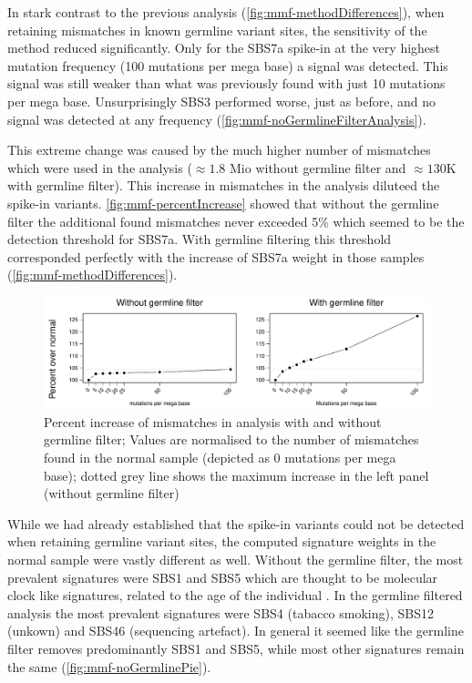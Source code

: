 In stark contrast to the previous analysis (\autoref{fig:mmf-methodDifferences}), when retaining mismatches in known germline variant sites, the sensitivity of the method reduced significantly. Only for the SBS7a spike-in at the very highest mutation frequency (100 mutations per mega base) a signal was detected. This signal was still weaker than what was previously found with just 10 mutations per mega base. Unsurprisingly SBS3 performed worse, just as before, and no signal was detected at any frequency (\autoref{fig:mmf-noGermlineFilterAnalysis}).

This extreme change was caused by the much higher number of mismatches which were used in the analysis ($\approx 1.8$ Mio without germline filter and $\approx 130$K with germline filter).
This increase in mismatches in the analysis diluteed the spike-in variants. \autoref{fig:mmf-percentIncrease} showed that without the germline filter the additional found mismatches never exceeded 5\% which seemed to be the detection threshold for SBS7a. With germline filtering this threshold corresponded perfectly with the increase of SBS7a weight in those samples (\autoref{fig:mmf-methodDifferences}).

\begin{figure}[ht]
\centering
\includegraphics[width=.99\linewidth]{Figures/MisMatchFinder/spikeInPercentage.pdf}
\caption[Percent increase of mismatches in analysis with and without germline filter]{Percent increase of mismatches in analysis with and without germline filter; Values are normalised to the number of mismatches found in the normal sample (depicted as \num{0} mutations per mega base); dotted grey line shows the maximum increase in the left panel (without germline filter)}\label{fig:mmf-percentIncrease}
\end{figure}

While we had already established that the spike-in variants could not  be detected when retaining germline variant sites, the computed signature weights in the normal sample were vastly different as well. Without the germline filter, the most prevalent signatures were SBS1 and SBS5 which are thought to be molecular clock like signatures, related to the age of the individual \cite{Alexandrov2020}. In the germline filtered analysis the most prevalent signatures were SBS4 (tabacco smoking), SBS12 (unkown) and SBS46 (sequencing artefact). In general it seemed like the germline filter removes predominantly SBS1 and SBS5, while most other signatures remain the same (\autoref{fig:mmf-noGermlinePie}).

